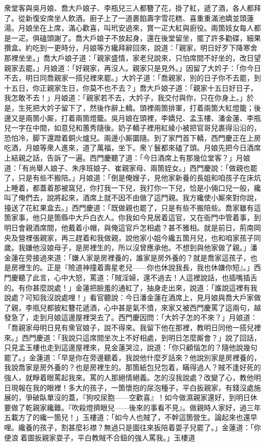 衆堂客與吳月娘、喬大戶娘子、李瓶兒三人都簪了花，掛了紅，遞了酒，各人都拜了。從新復安席坐人飲酒。廚子上了一道裹餡壽字雪花糕、喜重重滿池嬌並頭蓮湯。月娘坐在上席，滿心歡喜，叫玳安過來，賞一疋大紅與廚役。兩箇妓女每人都是一疋。俱磕頭謝了。喬大戶娘子不放起身，還在後堂留坐，擺了許多勸碟，細果攢盒。約吃到一更時分，月娘等方纔拜辭回來，說道：「親家，明日好歹下降寒舍那裡坐坐。」喬大戶娘子道：「親家盛情，家老兒說來，只怕席間不好坐的，改日望親家去罷。」月娘道：「好親家，再沒人。親家只是見外。」因留了大妗子：「你今日不去，明日同喬親家一搭兒裡來罷。」大妗子道：「喬親家，別的日子你不去罷，到十五日，你正親家生日，你莫不也不去？」喬大戶娘子道：「親家十五日好日子，我怎敢不去！」月娘道：「親家若不去，大妗子，我交付與你，只在你身上。」於是，生死把大妗子留下了，然後作辭上轎。頭裡兩箇排軍，打着兩箇大紅燈籠；後邊又是兩箇小厮，打着兩箇燈籠。吳月娘在頭裡，李嬌兒、孟玉樓、潘金蓮、李瓶兒一字在中間，如意兒和蕙秀隨後。奶子轎子裡用紅綾小被把官哥兒裹得沿沿的，恐怕冷，脚下還蹬着銅火爐兒。兩邊小厮圜隨。到了家門首下轎，西門慶正在上房吃酒，月娘等衆人進來，道了萬福，坐下。衆丫鬟都來磕了頭。月娘先把今日酒席上結親之話，告訴了一遍。西門慶聽了道：「今日酒席上有那幾位堂客？」月娘道：「有尚舉人娘子、朱序班娘子、崔親家母、兩箇姪女。」西門慶說：「做親也罷了，只是有些不搬陪。」月娘道：「倒是俺嫂子，見他家新養的長姐和咱孩子在床炕上睡着，都蓋着那被窩兒，你打我一下兒，我打你一下兒，恰是小倆口兒一般，纔叫了俺們去，說將起來，酒席上就不因不由做了這門親。我方纔使小厮來對你說，擡送了花紅果盒去。」西門慶道：「既做親也罷了，只是有些不搬陪些。喬家雖有這箇家事，他只是箇縣中大戶白衣人。你我如今見居着這官，又在衙門中管着事，到明日會親酒席間，他戴着小帽，與俺這官戶怎相處？甚不雅相。就是前日，荊南岡央及營裡張親家，再三趕着和我做親，說他家小姐今纔五箇月兒，也和咱家孩子同歲。我嫌他沒娘母子，是房裡生的，所以沒曾應承他。不想到與他家做了親。」潘金蓮在旁接過來道：「嫌人家是房裡養的，誰家是房外養的？就是喬家這孩子，也是房裡生的。正是『險道神撞着壽星老兒——你也休說我長，我也休嫌你短』。」西門慶聽了此言，心中大怒，罵道：「賊淫婦，還不過去！人這裡說話，也插嘴插舌的。有你甚麼說處！」金蓮把臉羞的通紅了，抽身走出來，說道：「誰說這裡有我說處？可知我沒說處哩！」{}看官聽說：今日潘金蓮在酒席上，見月娘與喬大戶家做了親，李瓶兒都披紅簪花遞酒，心中甚是氣不憤，來家又被西門慶罵了這兩句，越發急了，走到月娘這邊屋裡哭去了。西門慶因問：「大妗子怎的不來？」月娘道：「喬親家母明日見有衆官娘子，說不得來。我留下他在那裡，教明日同他一搭兒裡來。」西門慶道：「我說只這席間坐次上不好相處，到明日怎麼厮會？」說了回話，只見孟玉樓也走到這邊屋裡來，見金蓮哭泣，說道：「你只顧惱怎的？隨他說幾句罷了。」金蓮道：「早是你在旁邊聽着，我說他什麼歹話來？他說別家是房裡養的，我說喬家是房外養的？也是房裡生的。那箇紙包兒包着，瞞得過人？賊不逢好死的強人，就睜着眼罵起我來。罵的人那絕情絕義。怎的沒我說處？改變了心，教他明日現報在我的眼裡！多大的孩子，一箇懷抱的尿泡種子，平白扳親家，有錢沒處施展的，爭破臥單沒的蓋，『狗咬尿胞——空歡喜』！如今做濕親家還好，到明日休要做了乾親家纔難。『吹殺燈擠眼兒——後來的事看不見』。做親時人家好，過三年五載方了的纔一箇兒！」玉樓道：「如今人也賊了，不幹這箇營生。論起來也還早哩。纔養的孩子，割甚麼衫襟？無過只是圖往來扳陪着耍子兒罷了。」{}金蓮道：「你便浪𢵞着圖扳親家耍子，平白教賊不合鈕的強人罵我。」玉樓道